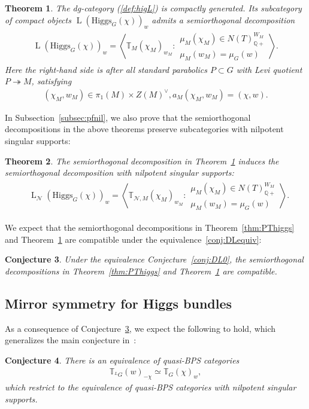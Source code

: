 \documentclass [11pt,oneside,a4paper,mathscr]{amsart}
\newtheorem{thm}{Theorem}[section]
\newtheorem{conj}[thm]{Conjecture}
\theoremstyle{definition}
\newcommand{\LL}{\operatorname{L}}
\newcommand{\Hig}{\mathrm{Higgs}}
\begin{document}
\begin{thm}\label{thm:mainLG}
The dg-category (\ref{def:higL}) is compactly generated. Its subcategory 
of compact objects 
$\LL(\Hig_G(\chi))_w$ admits a semiorthogonal decomposition 
\begin{align*}
    \LL(\Hig_G(\chi))_w=\left\langle \mathbb{T}_{M}(\chi_{M})_{w_{M}} : \begin{array}{ll}
     \mu_M(\chi_{M})\in N(T)_{\mathbb{Q}+}^{W_M} \\ \mu_M(w_M)=\mu_G(w) \end{array}\right\rangle.
\end{align*}
   Here the right-hand side is after all standard parabolics $P\subset G$ with 
    Levi quotient $P\twoheadrightarrow M$, satisfying
    \begin{align*}(\chi_{M}, w_{M}) \in \pi_1(M) \times Z(M)^{\vee}, \mathbb{}a_{M}(\chi_{M}, w_{M})=(\chi, w).
    \end{align*}
\end{thm}
In Subsection~\ref{subsec:pfnil}, 
we also prove that the semiorthogonal decompositions in the above theorems preserve
subcategories with nilpotent singular supports: 
\begin{thm}\label{thm:nilp}
The semiorthogonal decomposition in Theorem~\ref{thm:mainLG} induces the 
semiorthogonal decomposition with nilpotent singular supports: 
\begin{align*}
    &\LL_{\mathcal{N}}(\Hig_G(\chi))_w=\left\langle \mathbb{T}_{\mathcal{N}, M}(\chi_{M})_{w_{M}} : \begin{array}{ll}
     \mu_M(\chi_{M})\in N(T)_{\mathbb{Q}+}^{W_M} \\ \mu_M(w_M)=\mu_G(w) \end{array}\right\rangle. 
\end{align*}
\end{thm}

We expect that the semiorthogonal decompositions in Theorem~\ref{thm:PThiggs} and Theorem~\ref{thm:mainLG}
are compatible under the equivalence~\eqref{conj:DLequiv}:
\begin{conj}\label{conj:compati:sod}
Under the equivalence Conjecture~\ref{conj:DL0}, the semiorthogonal 
decompositions in Theorem~\ref{thm:PThiggs} and Theorem~\ref{thm:mainLG}
are compatible.
\end{conj}

\subsection{Mirror symmetry for Higgs bundles}
As a consequence of Conjecture~\ref{conj:compati:sod}, we expect the following to hold, which generalizes the main conjecture in~\cite{PThiggs}:
\begin{conj}\label{conj:G}
There is an equivalence of quasi-BPS categories
    \begin{align}\label{conj:PThiggs}
        \mathbb{T}_{^{L}G}(w)_{-\chi} \simeq \mathbb{T}_{G}(\chi)_w,
    \end{align}
which restrict to the equivalence of quasi-BPS categories with nilpotent singular supports.
\end{conj}
\end{document}

